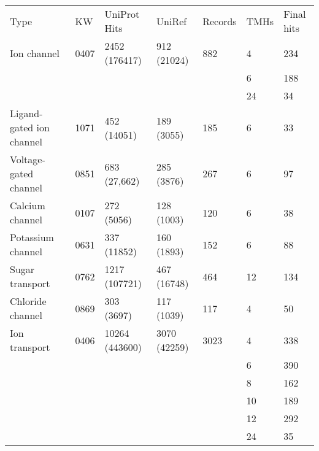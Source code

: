 \begin{table}[htbp]
\begin{tabular}{lllllll}
  Type                     & KW & UniProt Hits   & UniRef &  Records & TMHs & Final hits \\
  Ion channel              & 0407            & 2452 (176417)  & 912 (21024)            & 882                & 4    & 234        \\
                           &                    &                &                        &                    & 6    & 188        \\
                           &                    &                &                        &                    & 24   & 34         \\
  Ligand\--gated ion channel & 1071            & 452 (14051)    & 189 (3055)             & 185                & 6    & 33         \\
  Voltage\--gated channel    & 0851            & 683 (27,662)   & 285 (3876)             & 267                & 6    & 97         \\
  Calcium channel          & 0107            & 272 (5056)     & 128 (1003)             & 120                & 6    & 38         \\
  Potassium channel        & 0631            & 337 (11852)    & 160 (1893)             & 152                & 6    & 88         \\
  Sugar transport          & 0762            & 1217 (107721)  & 467 (16748)            & 464                & 12   & 134        \\
  Chloride channel         & 0869            & 303 (3697)     & 117 (1039)             & 117                & 4    & 50         \\
  Ion transport            & 0406            & 10264 (443600) & 3070 (42259)           & 3023               & 4    & 338        \\
                           &                    &                &                        &                    & 6    & 390        \\
                           &                    &                &                        &                    & 8    & 162        \\
                           &                    &                &                        &                    & 10   & 189        \\
                           &                    &                &                        &                    & 12   & 292        \\
                           &                    &                &                        &                    & 24   & 35
\end{tabular}
\label{table:datasetsizes}
\end{table}


